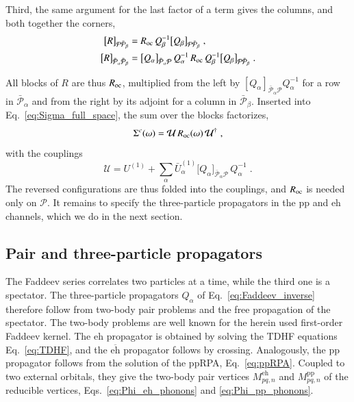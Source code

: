 \documentclass[aip,jcp,reprint,noshowkeys,superscriptaddress]{revtex4-1}
\newcommand{\eh}{\text{eh}}
\newcommand{\teh}{\overline{\text{eh}}}
\newcommand{\pp}{\text{pp}}
\begin{document}
Third, the same argument for the last factor of a term gives the
columns, and both together the corners,
\begin{equation}
\begin{aligned}
\big[R\big]_{\mathcal P\bar{\mathcal P}_\beta}
&=
R_{\rm oc}\,Q_\beta^{-1}\big[Q_\beta\big]_{\mathcal P\bar{\mathcal P}_\beta} \;,
\\
\big[R\big]_{\bar{\mathcal P}_\alpha\bar{\mathcal P}_\beta}
&=
\big[Q_\alpha\big]_{\bar{\mathcal P}_\alpha\mathcal P}\,Q_\alpha^{-1}\,
R_{\rm oc}\,
Q_\beta^{-1}\big[Q_\beta\big]_{\mathcal P\bar{\mathcal P}_\beta} \;.
\end{aligned}
\nonumber
\end{equation}

All blocks of $R$ are thus $R_{\rm oc}$, multiplied from the left by
$[Q_\alpha]_{\bar{\mathcal P}_\alpha\mathcal P}Q_\alpha^{-1}$ for a row
in $\bar{\mathcal P}_\alpha$ and from the right by its adjoint for a
column in $\bar{\mathcal P}_\beta$. Inserted into
Eq.~\eqref{eq:Sigma_full_space}, the sum over the blocks factorizes,
\begin{equation}
\Sigma^{c}(\omega)
=
\mathcal U\,R_{\rm oc}(\omega)\,\mathcal U^\dagger \;,
\nonumber
\end{equation}
with the couplings
\begin{equation}
\mathcal U
=
U^{(1)}+\sum_\alpha\bar U^{(1)}_\alpha
\big[Q_\alpha\big]_{\bar{\mathcal P}_\alpha\mathcal P}\,Q_\alpha^{-1} \;.
\label{eq:U_general}
\end{equation}
The reversed configurations are thus folded into the couplings, and
$R_{\rm oc}$ is needed only on $\mathcal P$. It remains to specify the
three-particle propagators in the $\pp$ and $\eh$ channels, which we do
in the next section.


\subsection{Pair and three-particle propagators}
\label{sec:propagators}
The Faddeev series correlates two particles at a time, while the third one
is a spectator. The three-particle propagators $Q_\alpha$ of
Eq.~\eqref{eq:Faddeev_inverse} therefore follow from two-body pair problems
and the free propagation of the spectator.
The two-body problems are well known
for the herein used first-order Faddeev kernel.\cite{orlando2023three}
The $\eh$ propagator is obtained by solving the TDHF equations Eq.~\eqref{eq:TDHF}, and the 
$\teh$ propagator follows by crossing. Analogously, the $\pp$ propagator follows from the 
solution of the ppRPA, Eq.~\eqref{eq:ppRPA}.
Coupled to two external orbitals, they give the two-body pair vertices $M^{\eh}_{pq,n}$ and
$M^{\pp}_{pq,n}$ of the reducible vertices, Eqs.~\eqref{eq:Phi_eh_phonons}
and \eqref{eq:Phi_pp_phonons}.
\end{document}
